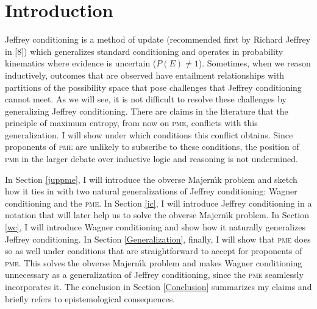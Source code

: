 \documentclass[entropy,article,submit,oneauthor,pdftex,12pt,a4paper]{mdpi}
\begin{document}




\section{Introduction}
\label{Introduction}

Jeffrey conditioning is a method of update (recommended first by
Richard Jeffrey in [8]) which generalizes standard conditioning and
operates in probability kinematics where evidence is uncertain
($P(E)\neq{}1$). Sometimes, when we reason inductively, outcomes that
are observed have entailment relationships with partitions of the
possibility space that pose challenges that Jeffrey conditioning
cannot meet. As we will see, it is not difficult to resolve these
challenges by generalizing Jeffrey conditioning. There are claims in
the literature that the principle of maximum entropy, from now on
\textsc{pme}, conflicts with this generalization. I will show under
which conditions this conflict obtains. Since proponents of
\textsc{pme} are unlikely to subscribe to these conditions, the
position of \textsc{pme} in the larger debate over inductive logic and
reasoning is not undermined.

In Section \ref{juppme}, I will introduce the obverse Majern{\'\i}k
problem and sketch how it ties in with two natural generalizations of
Jeffrey conditioning: Wagner conditioning and the \textsc{pme}. In
Section \ref{jc}, I will introduce Jeffrey conditioning in a notation
that will later help us to solve the obverse Majern{\'\i}k problem. In
Section \ref{wc}, I will introduce Wagner conditioning and show how it
naturally generalizes Jeffrey conditioning. In Section
\ref{Generalization}, finally, I will show that \textsc{pme} does so
as well under conditions that are straightforward to accept for
proponents of \textsc{pme}. This solves the obverse Majern{\'\i}k
problem and makes Wagner conditioning unnecessary as a generalization
of Jeffrey conditioning, since the \textsc{pme} seamlessly
incorporates it. The conclusion in Section \ref{Conclusion} summarizes
my claims and briefly refers to epistemological consequences.
\end{document}
